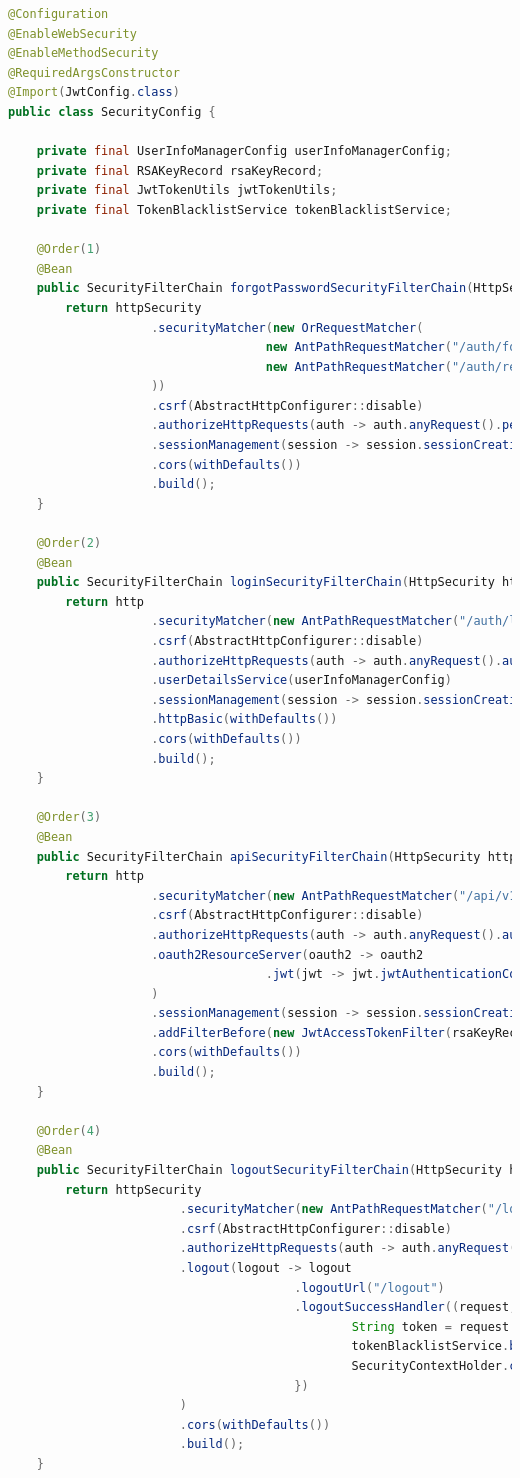 \begin{lstlisting}[language=Java, style=JavaStyle, caption=Pełna konfiguracja łańcucha filtrów bezpieczeństwa]
@Configuration
@EnableWebSecurity
@EnableMethodSecurity
@RequiredArgsConstructor
@Import(JwtConfig.class)
public class SecurityConfig {

    private final UserInfoManagerConfig userInfoManagerConfig;
    private final RSAKeyRecord rsaKeyRecord;
    private final JwtTokenUtils jwtTokenUtils;
    private final TokenBlacklistService tokenBlacklistService;

    @Order(1)
    @Bean
    public SecurityFilterChain forgotPasswordSecurityFilterChain(HttpSecurity httpSecurity) throws Exception {
        return httpSecurity
					.securityMatcher(new OrRequestMatcher(
									new AntPathRequestMatcher("/auth/forgot-password"),
									new AntPathRequestMatcher("/auth/reset-password")
					))
					.csrf(AbstractHttpConfigurer::disable)
					.authorizeHttpRequests(auth -> auth.anyRequest().permitAll())
					.sessionManagement(session -> session.sessionCreationPolicy(SessionCreationPolicy.STATELESS))
					.cors(withDefaults())
					.build();
    }

    @Order(2)
    @Bean
    public SecurityFilterChain loginSecurityFilterChain(HttpSecurity http) throws Exception {
        return http
					.securityMatcher(new AntPathRequestMatcher("/auth/login"))
					.csrf(AbstractHttpConfigurer::disable)
					.authorizeHttpRequests(auth -> auth.anyRequest().authenticated())
					.userDetailsService(userInfoManagerConfig)
					.sessionManagement(session -> session.sessionCreationPolicy(SessionCreationPolicy.STATELESS))
					.httpBasic(withDefaults())
					.cors(withDefaults())
					.build();
    }

    @Order(3)
    @Bean
    public SecurityFilterChain apiSecurityFilterChain(HttpSecurity http) throws Exception {
        return http
					.securityMatcher(new AntPathRequestMatcher("/api/v1/**"))
					.csrf(AbstractHttpConfigurer::disable)
					.authorizeHttpRequests(auth -> auth.anyRequest().authenticated())
					.oauth2ResourceServer(oauth2 -> oauth2
									.jwt(jwt -> jwt.jwtAuthenticationConverter(jwtAuthenticationConverter()))
					)
					.sessionManagement(session -> session.sessionCreationPolicy(SessionCreationPolicy.STATELESS))
					.addFilterBefore(new JwtAccessTokenFilter(rsaKeyRecord, jwtTokenUtils, tokenBlacklistService), UsernamePasswordAuthenticationFilter.class)
					.cors(withDefaults())
					.build();
    }

    @Order(4)
    @Bean
    public SecurityFilterChain logoutSecurityFilterChain(HttpSecurity httpSecurity) throws Exception {
        return httpSecurity
						.securityMatcher(new AntPathRequestMatcher("/logout"))
						.csrf(AbstractHttpConfigurer::disable)
						.authorizeHttpRequests(auth -> auth.anyRequest().authenticated())
						.logout(logout -> logout
										.logoutUrl("/logout")
										.logoutSuccessHandler((request, response, authentication) -> {
												String token = request.getHeader("Authorization").replace("Bearer ", "");
												tokenBlacklistService.blacklistToken(token);
												SecurityContextHolder.clearContext();
										})
						)
						.cors(withDefaults())
						.build();
    }


\end{lstlisting}
